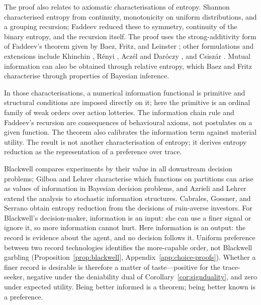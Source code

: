 \documentclass[11pt,a4paper]{article}
\theoremstyle{definition}
\newcommand{\1}{\mathbf 1}
\begin{document}
The proof also relates to axiomatic characterisations of entropy.  Shannon \cite{Shannon1948} characterised
entropy from continuity, monotonicity on uniform distributions, and a grouping recursion; Faddeev
\cite{Faddeev1956} reduced these to symmetry, continuity of the binary entropy, and the recursion itself.  The
proof uses the strong-additivity form of Faddeev's theorem given by Baez, Fritz, and Leinster
\cite{BaezFritzLeinster2011}; other formulations and extensions include Khinchin \cite{Khinchin1957}, R\'enyi
\cite{Renyi1961}, Acz\'el and Dar\'oczy \cite{AczelDaroczy1975}, and Csisz\'ar \cite{Csiszar2008}.  Mutual
information can also be obtained through relative entropy, which Baez and Fritz \cite{BaezFritz2014}
characterise through properties of Bayesian inference.

In those characterisations, a numerical information functional is primitive and structural conditions are
imposed directly on it; here the primitive is an ordinal family of weak orders over action lotteries.  The
information chain rule and Faddeev's recursion are consequences of behavioural axioms, not postulates on a given
function.  The theorem also calibrates the information term against material utility.  The result is not another
characterisation of entropy; it derives entropy reduction as the representation of a preference over trace.

Blackwell \cite{Blackwell1953} compares experiments by their value in all downstream decision problems; Gilboa
and Lehrer \cite{GilboaLehrer1991} characterise which functions on partitions can arise as values of information
in Bayesian decision problems, and Azrieli and Lehrer \cite{AzrieliLehrer2008} extend the analysis to stochastic
information structures.  Cabrales, Gossner, and Serrano \cite{CabralesGossnerSerrano2013} obtain entropy
reduction from the decisions of ruin-averse investors.  For Blackwell's decision-maker, information is an input:
she can use a finer signal or ignore it, so more information cannot hurt.  Here information is an output: the
record is evidence about the agent, and no decision follows it.  Uniform preference between two record
technologies identifies the more-capable order, not Blackwell garbling (Proposition~\ref{prop:blackwell},
Appendix~\ref{app:choice-proofs}).  Whether a finer record is desirable is therefore a matter of taste---positive
for the trace-seeker, negative under the deniability dual of Corollary~\ref{cor:signduality}, and zero under
expected utility.  Being better informed is a theorem; being better known is a preference.
\end{document}
